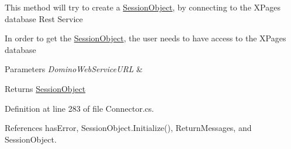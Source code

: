 This method will try to create a \mbox{\hyperlink{class_session_object}{Session\+Object}}, by connecting to the X\+Pages database Rest Service 

In order to get the \mbox{\hyperlink{class_session_object}{Session\+Object}}, the user needs to have access to the X\+Pages database


\begin{DoxyParams}{Parameters}
{\em Domino\+Web\+Service\+U\+RL} & \\
\hline
\end{DoxyParams}
\begin{DoxyReturn}{Returns}
\mbox{\hyperlink{class_session_object}{Session\+Object}}
\end{DoxyReturn}


Definition at line 283 of file Connector.\+cs.



References has\+Error, Session\+Object.\+Initialize(), Return\+Messages, and Session\+Object.


